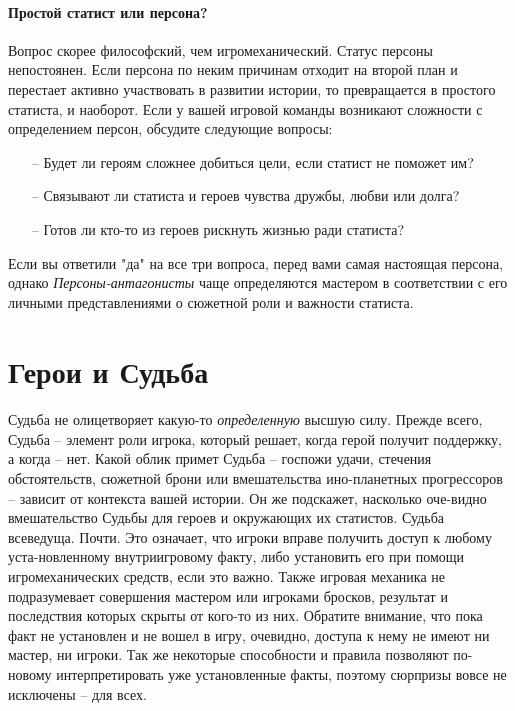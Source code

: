 \paragraph{Простой статист или персона?} Вопрос скорее философский, чем игромеханический. Статус персоны непостоянен. Если персона по неким причинам отходит на второй план и перестает активно участвовать в развитии истории, то превращается в простого статиста, и наоборот. Если у вашей игровой команды возникают сложности с определением персон, обсудите следующие вопросы:
\begin{itemize}
\item[--] Будет ли героям сложнее добиться цели, если статист не поможет им?
\item[--] Связывают ли статиста и героев чувства дружбы, любви или долга?
\item[--] Готов ли кто-то из героев рискнуть жизнью ради статиста?
\end{itemize}
Если вы ответили "да" на все три вопроса, перед вами самая настоящая персона, однако \textit{Персоны-антагонисты} чаще определяются мастером в соответствии с его личными представлениями о сюжетной роли и важности статиста.

\section{Герои и Судьба}
\paragraph{}Судьба не олицетворяет какую-то \textit{определенную} высшую силу. Прежде всего, Судьба – элемент роли игрока, который решает, когда герой получит поддержку, а когда – нет. Какой облик примет Судьба – госпожи удачи, стечения обстоятельств, сюжетной брони или вмешательства ино-планетных прогрессоров – зависит от контекста вашей истории. Он же подскажет, насколько оче-видно вмешательство Судьбы для героев и окружающих их статистов.
\newline Судьба всеведуща. Почти. Это означает, что игроки вправе получить доступ к любому уста-новленному внутриигровому факту, либо установить его при помощи игромеханических средств, если это важно. Также игровая механика не подразумевает совершения мастером или игроками бросков, результат и последствия которых скрыты от кого-то из них.
\newline Обратите внимание, что пока факт не установлен и не вошел в игру, очевидно, доступа к нему не имеют ни мастер, ни игроки. Так же некоторые способности и правила позволяют по-новому интерпретировать уже установленные факты, поэтому сюрпризы вовсе не исключены – для всех.
